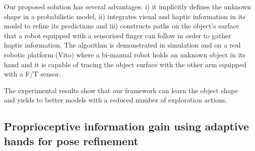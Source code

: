 \documentclass[a4paper,11pt,pdf]{pacmanreport}
\begin{document}
Our proposed solution has several advantages: i) it implicitly defines the unknown shape in a probabilistic model, ii) integrates visual and haptic information in its model to refine its predictions and iii) constructs paths on the object's surface that a robot equipped with a sensorised finger can follow in order to gather haptic information. 
The algorithm is demonstrated in simulation and on a real robotic platform (Vito) where a bi-manual robot holds an unknown object in its hand and it is capable of tracing the object surface with the other arm equipped with a F/T sensor.

The experimental results show that our framework can learn the object shape and yields to better models with a reduced number of exploration actions.

\subsection{Proprioceptive information gain using adaptive hands for pose refinement}
\end{document}
